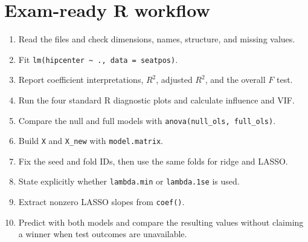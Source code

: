 ﻿\documentclass[11pt]{article}
\begin{document}
\section{Exam-ready R workflow}

\begin{enumerate}
  \item Read the files and check dimensions, names, structure, and missing values.
  \item Fit \texttt{lm(hipcenter \textasciitilde\ ., data = seatpos)}.
  \item Report coefficient interpretations, $R^2$, adjusted $R^2$, and the
  overall $F$ test.
  \item Run the four standard R diagnostic plots and calculate influence and VIF.
  \item Compare the null and full models with \texttt{anova(null\_ols, full\_ols)}.
  \item Build \texttt{X} and \texttt{X\_new} with \texttt{model.matrix}.
  \item Fix the seed and fold IDs, then use the same folds for ridge and LASSO.
  \item State explicitly whether \texttt{lambda.min} or \texttt{lambda.1se} is
  used.
  \item Extract nonzero LASSO slopes from \texttt{coef()}.
  \item Predict with both models and compare the resulting values without
  claiming a winner when test outcomes are unavailable.
\end{enumerate}
\end{document}
